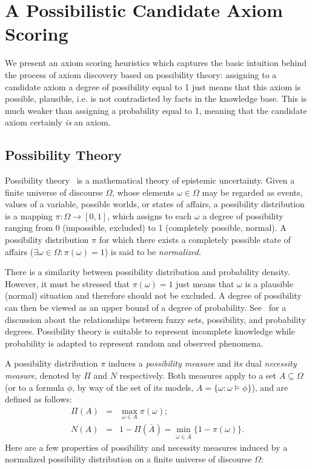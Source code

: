 \documentclass{llncs}
\begin{document}
\section{A Possibilistic Candidate Axiom Scoring}
\label{possibility-theory}

We present an axiom scoring heuristics which captures the basic intuition
behind the process of axiom discovery based on possibility theory: assigning to a candidate axiom a degree of possibility equal to 1 just means that this axiom is possible, plausible, i.e. is not contradicted by facts in the knowledge base. This is  much weaker than assigning a probability equal to 1, meaning that the candidate axiom certainly \textit{is} an axiom.

\subsection{Possibility Theory}

Possibility theory~\cite{Zadeh1978} is a mathematical theory of epistemic uncertainty.
Given a finite universe of discourse $\Omega$, whose elements $\omega\in\Omega$
may be regarded as events, values of a variable, possible worlds, or states of affairs,
a possibility distribution is a mapping $\pi: \Omega \to [0, 1]$,
which assigns to each $\omega$ a degree of possibility ranging from 0 (impossible,
excluded) to 1 (completely possible, normal).
A possibility distribution $\pi$ for  which there exists a completely possible state of
affairs ($\exists \omega \in \Omega: \pi(\omega) = 1$) is said to be \emph{normalized}.

There is a similarity between possibility distribution and probability 
density. However, it must be stressed that $\pi(\omega) = 1$ just means that
$\omega$ is a plausible (normal) situation and therefore should not be excluded.
A degree of possibility can then be viewed as an upper bound of a degree of probability.
See~\cite{dubois1991} for a discussion
about the relationships between fuzzy sets, possibility, and probability 
degrees.
Possibility theory is suitable to represent incomplete knowledge while 
probability is adapted to represent random and observed phenomena. 


A possibility distribution $\pi$ induces a \emph{possibility
measure} and its dual \emph{necessity
measure}, denoted by $\Pi$ and $N$
respectively. Both measures apply to a set $A \subseteq\Omega$ (or to a
formula $\phi$, by way of the set of its models, $A = \{\omega : \omega \models \phi\}$),
and are defined as follows:
\begin{eqnarray}
  \Pi(A) &=& \max_{\omega\in A} \pi(\omega); \\
  N(A)   &=& 1 - \Pi(\bar{A}) = \min_{\omega\in \bar{A}} \{1 - \pi(\omega)\}.
\end{eqnarray}
%
Here are a few properties of possibility and necessity measures 
induced by a normalized possibility distribution on a finite universe of
discourse $\Omega$: 
\end{document}

